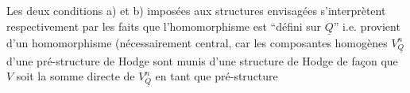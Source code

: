Les deux conditions a) et b) imposées aux structures envisagées s'interprètent respectivement par les faits que l'homomorphisme
est ``défini sur $\underline{Q}$'' i.e. provient d'un homomorphisme
(nécessairement central, car les composantes homogènes $V_{\underline{Q}}^n$ d'une pré-structure de Hodge sont  munis d'une structure de Hodge de façon que $V$ soit la somme directe de $V_{\underline{Q}}^n$ en tant que pré-structure

